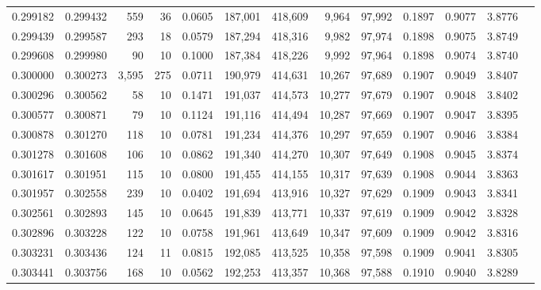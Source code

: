 \begin{tabular}{rrrrrrrrrrrrr}
0.299182 & 0.299432 &   559 &  36 &                                     0.0605 & 187,001 & 418,609 &   9,964 &  97,992 & 0.1897 & 0.9077 & 3.8776 \\
0.299439 & 0.299587 &   293 &  18 &                                     0.0579 & 187,294 & 418,316 &   9,982 &  97,974 & 0.1898 & 0.9075 & 3.8749 \\
0.299608 & 0.299980 &    90 &  10 &                                     0.1000 & 187,384 & 418,226 &   9,992 &  97,964 & 0.1898 & 0.9074 & 3.8740 \\
0.300000 & 0.300273 & 3,595 & 275 &                                     0.0711 & 190,979 & 414,631 &  10,267 &  97,689 & 0.1907 & 0.9049 & 3.8407 \\
0.300296 & 0.300562 &    58 &  10 &                                     0.1471 & 191,037 & 414,573 &  10,277 &  97,679 & 0.1907 & 0.9048 & 3.8402 \\
0.300577 & 0.300871 &    79 &  10 &                                     0.1124 & 191,116 & 414,494 &  10,287 &  97,669 & 0.1907 & 0.9047 & 3.8395 \\
0.300878 & 0.301270 &   118 &  10 &                                     0.0781 & 191,234 & 414,376 &  10,297 &  97,659 & 0.1907 & 0.9046 & 3.8384 \\
0.301278 & 0.301608 &   106 &  10 &                                     0.0862 & 191,340 & 414,270 &  10,307 &  97,649 & 0.1908 & 0.9045 & 3.8374 \\
0.301617 & 0.301951 &   115 &  10 &                                     0.0800 & 191,455 & 414,155 &  10,317 &  97,639 & 0.1908 & 0.9044 & 3.8363 \\
0.301957 & 0.302558 &   239 &  10 &                                     0.0402 & 191,694 & 413,916 &  10,327 &  97,629 & 0.1909 & 0.9043 & 3.8341 \\
0.302561 & 0.302893 &   145 &  10 &                                     0.0645 & 191,839 & 413,771 &  10,337 &  97,619 & 0.1909 & 0.9042 & 3.8328 \\
0.302896 & 0.303228 &   122 &  10 &                                     0.0758 & 191,961 & 413,649 &  10,347 &  97,609 & 0.1909 & 0.9042 & 3.8316 \\
0.303231 & 0.303436 &   124 &  11 &                                     0.0815 & 192,085 & 413,525 &  10,358 &  97,598 & 0.1909 & 0.9041 & 3.8305 \\
0.303441 & 0.303756 &   168 &  10 &                                     0.0562 & 192,253 & 413,357 &  10,368 &  97,588 & 0.1910 & 0.9040 & 3.8289 \\

\end{tabular}
